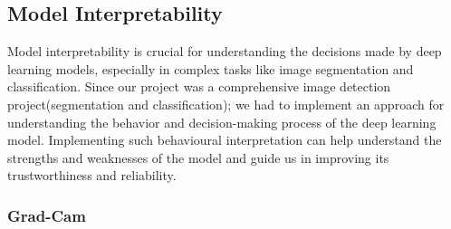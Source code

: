 \documentclass[12pt]{article}
\begin{document}
\clearpage
\newpage

\subsection{Model Interpretability}
Model interpretability is crucial for understanding the decisions made by deep learning models, especially in complex tasks like image segmentation and classification. 
Since our project was a comprehensive image detection project(segmentation and classification); we had to implement an approach for understanding the behavior and decision-making process of the deep learning model. Implementing such behavioural interpretation can help understand the strengths and weaknesses of the model and guide us in improving its trustworthiness and reliability.

\subsubsection{Grad-Cam}
\end{document}
